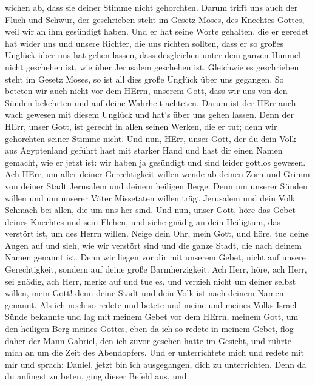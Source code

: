wichen ab, dass sie deiner Stimme nicht gehorchten. Darum trifft uns
auch der Fluch und Schwur, der geschrieben steht im Gesetz Moses, des
Knechtes Gottes, weil wir an ihm gesündigt haben.  Und er
hat seine Worte gehalten, die er geredet hat wider uns und unsere
Richter, die uns richten sollten, dass er so großes Unglück über uns hat
gehen lassen, dass desgleichen unter dem ganzen Himmel nicht geschehen
ist, wie über Jerusalem geschehen ist.  Gleichwie es
geschrieben steht im Gesetz Moses, so ist all dies große Unglück über
uns gegangen. So beteten wir auch nicht vor dem HErrn, unserem Gott,
dass wir uns von den Sünden bekehrten und auf deine Wahrheit achteten.
 Darum ist der HErr auch wach gewesen mit diesem Unglück
und hat's über uns gehen lassen. Denn der HErr, unser Gott, ist gerecht
in allen seinen Werken, die er tut; denn wir gehorchten seiner Stimme
nicht.  Und nun, HErr, unser Gott, der du dein Volk aus
Ägyptenland geführt hast mit starker Hand und hast dir einen Namen
gemacht, wie er jetzt ist: wir haben ja gesündigt und sind leider
gottlos gewesen.  Ach HErr, um aller deiner Gerechtigkeit
willen wende ab deinen Zorn und Grimm von deiner Stadt Jerusalem und
deinem heiligen Berge. Denn um unserer Sünden willen und um unserer
Väter Missetaten willen trägt Jerusalem und dein Volk Schmach bei allen,
die um uns her sind.  Und nun, unser Gott, höre das Gebet
deines Knechtes und sein Flehen, und siehe gnädig an dein Heiligtum, das
verstört ist, um des Herrn willen.  Neige dein Ohr, mein
Gott, und höre, tue deine Augen auf und sieh, wie wir verstört sind und
die ganze Stadt, die nach deinem Namen genannt ist. Denn wir liegen vor
dir mit unserem Gebet, nicht auf unsere Gerechtigkeit, sondern auf deine
große Barmherzigkeit.  Ach Herr, höre, ach Herr, sei
gnädig, ach Herr, merke auf und tue es, und verzieh nicht um deiner
selbst willen, mein Gott! denn deine Stadt und dein Volk ist nach deinem
Namen genannt.  Als ich noch so redete und betete und meine
und meines Volks Israel Sünde bekannte und lag mit meinem Gebet vor dem
HErrn, meinem Gott, um den heiligen Berg meines Gottes, 
eben da ich so redete in meinem Gebet, flog daher der Mann Gabriel, den
ich zuvor gesehen hatte im Gesicht, und rührte mich an um die Zeit des
Abendopfers.  Und er unterrichtete mich und redete mit mir
und sprach: Daniel, jetzt bin ich ausgegangen, dich zu unterrichten.
 Denn da du anfingst zu beten, ging dieser Befehl aus, und
